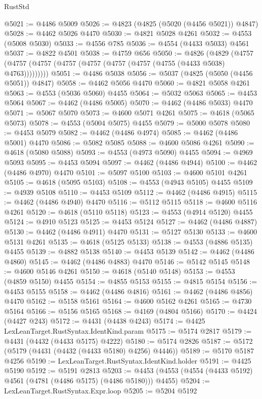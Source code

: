 \begin{lexlean}{RustStd}
\begin{coremodule}
@5021 := @4486 @5009
@5026 := @4823 (@4825 (@5020 (@4456 @5021)) @4847)
@5028 := @4462 @5026 @4470
@5030 := @4821 @5028 @4261
@5032 := @4553 (@5008 @5030)
@5033 := @4556 @785
@5036 := @4554 (@4433 @5033) @4561
@5037 := @4822 @4501
@5038 := @4759 @656
@5050 := @4826
    (@4829 (@4757 (@4757 (@4757 (@4757 (@4757 (@4757 (@4757 (@4755 (@4433 @5038) @4763)))))))))
@5051 := @4486 @5038
@5056 := @5037 (@4825 (@5050 (@4456 @5051)) @4847)
@5058 := @4462 @5056 @4470
@5060 := @4821 @5058 @4261
@5063 := @4553 (@5036 @5060) @4455
@5064 := @5032 @5063
@5065 := @4453 @5064
@5067 := @4462 (@4486 @5005)
@5070 := @4462 (@4486 @5033) @4470
@5071 := @5067 @5070
@5073 := @4600 @5071 @4261
@5075 := @4618 (@5065 @5073)
@5078 := @4553 (@5004 @5075) @4455
@5079 := @5000 @5078
@5080 := @4453 @5079
@5082 := @4462 (@4486 @4974)
@5085 := @4462 (@4486 @5001) @4470
@5086 := @5082 @5085
@5088 := @4600 @5086 @4261
@5090 := @4618 (@5080 @5088)
@5093 := @4553 (@4973 @5090) @4455
@5094 := @4969 @5093
@5095 := @4453 @5094
@5097 := @4462 (@4486 @4944)
@5100 := @4462 (@4486 @4970) @4470
@5101 := @5097 @5100
@5103 := @4600 @5101 @4261
@5105 := @4618 (@5095 @5103)
@5108 := @4553 (@4943 @5105) @4455
@5109 := @4939 @5108
@5110 := @4453 @5109
@5112 := @4462 (@4486 @4915)
@5115 := @4462 (@4486 @4940) @4470
@5116 := @5112 @5115
@5118 := @4600 @5116 @4261
@5120 := @4618 (@5110 @5118)
@5123 := @4553 (@4914 @5120) @4455
@5124 := @4910 @5123
@5125 := @4453 @5124
@5127 := @4462 (@4486 @4887)
@5130 := @4462 (@4486 @4911) @4470
@5131 := @5127 @5130
@5133 := @4600 @5131 @4261
@5135 := @4618 (@5125 @5133)
@5138 := @4553 (@4886 @5135) @4455
@5139 := @4882 @5138
@5140 := @4453 @5139
@5142 := @4462 (@4486 @4860)
@5145 := @4462 (@4486 @4883) @4470
@5146 := @5142 @5145
@5148 := @4600 @5146 @4261
@5150 := @4618 (@5140 @5148)
@5153 := @4553 (@4859 @5150) @4455
@5154 := @4855 @5153
@5155 := @4815 @5154
@5156 := @4453 @5155
@5158 := @4462 (@4486 @4816)
@5161 := @4462 (@4486 @4856) @4470
@5162 := @5158 @5161
@5164 := @4600 @5162 @4261
@5165 := @4730 @5164
@5166 := @5156 @5165
@5168 := @4169 (@4804 @5166)
@5170 := @4424 (@4427 @243)
@5172 := @4431 (@4438 @4243)
@5174 := @4425 LexLeanTarget.RustSyntax.IdentKind.param
@5175 := @5174 @2817
@5179 := @4431 (@4432 (@4433 @5175) @4222)
@5180 := @5174 @2826
@5187 := @5172 (@5179 (@4431 (@4432 (@4433 @5180) @4256) @4446))
@5189 := @5170 @5187 @4256
@5190 := LexLeanTarget.RustSyntax.IdentKind.holder
@5191 := @4425 @5190
@5192 := @5191 @2813
@5203 := @4453 (@4553 (@4554 (@4433 @5192) @4561 (@4781 (@4486 @5175) (@4486 @5180))) @4455)
@5204 := LexLeanTarget.RustSyntax.Expr.loop
@5205 := @5204 @5192

\end{coremodule}
\end{lexlean}
